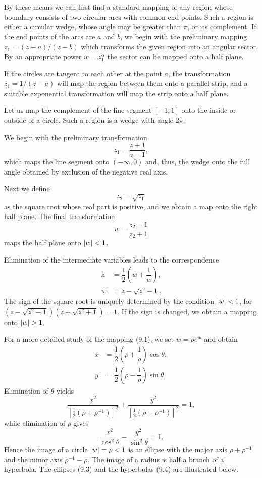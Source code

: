 By these means we can first find a standard mapping of any region whose boundary consists of two circular arcs with common end points. Such a region is either a circular wedge, whose angle may be greater than $\pi$, or its complement. If the end points of the arcs are $a$ and $b$, we begin with the preliminary mapping $z_1=(z-a)/(z-b)$ which transforms the given region into an angular sector. By an appropriate power $w=z_1^{\alpha}$ the sector can be mapped onto a half plane.

If the circles are tangent to each other at the point $a$, the transformation $z_1=1/(z-a)$ will map the region between them onto a parallel strip, and a suitable exponential transformation will map the strip onto a half plane.

\begin{example}
    Let us map the complement of the line segment $[-1,1]$ onto the inside or outside of a circle. Such a region is a wedge with angle $2\pi$.

    We begin with the preliminary transformation $$z_1=\dfrac{z+1}{z-1},$$ which maps the line segment onto $(-\infty,0)$ and, thus, the wedge onto the full angle obtained by exclusion of the negative real axis.

    Next we define $$z_2=\sqrt{z_1}$$ as the square root whose real part is positive, and we obtain a map onto the right half plane. The final transformation $$w=\dfrac{z_2-1}{z_2+1}$$ maps the half plane onto $\lvert w \rvert<1$.

    Elimination of the intermediate variables leads to the correspondence
    \begin{align}
        z &=\dfrac{1}{2}\left(w+\dfrac{1}{w}\right), \\
        w &=z-\sqrt{z^2-1}.
    \end{align}
    The sign of the square root is uniquely determined by the condition $\lvert w \rvert<1$, for $(z-\sqrt{z^2-1})(z+\sqrt{z^2+1})=1$. If the sign is changed, we obtain a mapping onto $\lvert w \rvert>1$.

    For a more detailed study of the mapping (9.1), we set $w=\rho e^{i \theta}$ and obtain
    \begin{align*}
        x &=\dfrac{1}{2}\left(\rho+\dfrac{1}{\rho}\right)\cos \theta, \\
        y &=\dfrac{1}{2}\left(\rho-\dfrac{1}{\rho}\right)\sin \theta.
    \end{align*}
    Elimination of $\theta$ yields
    \begin{equation}
        \dfrac{x^2}{\left[\frac{1}{2}\left(\rho+\rho^{-1}\right)\right]^2}+\dfrac{y^2}{\left[\frac{1}{2}\left(\rho-\rho^{-1}\right)\right]^2}=1,
    \end{equation}
    while elimination of $\rho$ gives
    \begin{equation}
        \dfrac{x^2}{\cos^2 \theta}-\dfrac{y^2}{\sin^2 \theta}=1.
    \end{equation}
    Hence the image of a circle $\lvert w \rvert=\rho<1$ is an ellipse with the major axis $\rho+\rho^{-1}$ and the minor axis $\rho^{-1}-\rho$. The image of a radius is half a branch of a hyperbola. The ellipses (9.3) and the hyperbolas (9.4) are illustrated below.
\end{example}

